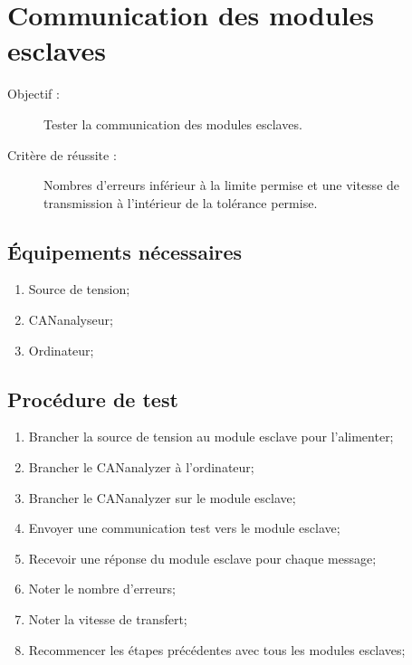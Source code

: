 
\section{Communication des modules esclaves}

	\begin{description}
		\item[Objectif :] Tester la communication des modules esclaves.
		\item[Critère de réussite :] Nombres d'erreurs inférieur à la limite permise et une vitesse de transmission à l'intérieur de la tolérance permise.
	\end{description}
	
	\subsection*{Équipements nécessaires}
	\begin{enumerate}
		\item Source de tension;
		\item CANanalyseur;
		\item Ordinateur;		
	\end{enumerate}	
	
	\subsection*{Procédure de test}
	\begin{enumerate}
		\item Brancher la source de tension au module esclave pour l'alimenter;
		\item Brancher le CANanalyzer à l'ordinateur;
		\item Brancher le CANanalyzer sur le module esclave;		
		\item Envoyer une communication test vers le module esclave;
		\item Recevoir une réponse du module esclave pour chaque message;
		\item Noter le nombre d'erreurs; 
		\item Noter la vitesse de transfert;
		\item Recommencer les étapes précédentes avec tous les modules esclaves;
		
	\end{enumerate}